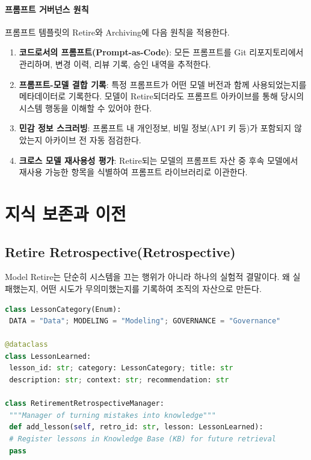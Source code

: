 \paragraph{프롬프트 거버넌스 원칙}
프롬프트 템플릿의 Retire와 Archiving에 다음 원칙을 적용한다.

\begin{enumerate}
 \item \textbf{코드로서의 프롬프트(Prompt-as-Code)}: 모든 프롬프트를 Git 리포지토리에서 관리하며, 변경 이력, 리뷰 기록, 승인 내역을 추적한다.
 \item \textbf{프롬프트-모델 결합 기록}: 특정 프롬프트가 어떤 모델 버전과 함께 사용되었는지를 메타데이터로 기록한다. 모델이 Retire되더라도 프롬프트 아카이브를 통해 당시의 시스템 행동을 이해할 수 있어야 한다.
 \item \textbf{민감 정보 스크러빙}: 프롬프트 내 개인정보, 비밀 정보(API 키 등)가 포함되지 않았는지 아카이브 전 자동 점검한다.
 \item \textbf{크로스 모델 재사용성 평가}: Retire되는 모델의 프롬프트 자산 중 후속 모델에서 재사용 가능한 항목을 식별하여 프롬프트 라이브러리로 이관한다.
\end{enumerate}


\section{지식 보존과 이전}
\label{sec:12.4}

\subsection{Retire Retrospective(Retrospective)}
\label{sec:12.4.2}

Model Retire는 단순히 시스템을 끄는 행위가 아니라 하나의 실험적 결말이다. 왜 실패했는지, 어떤 시도가 무의미했는지를 기록하여 조직의 자산으로 만든다.

\begin{lstlisting}[language=Python, caption={Retirement Retrospective and Lessons Learned Management System}, label={lst:retirement_retrospective}]
class LessonCategory(Enum):
 DATA = "Data"; MODELING = "Modeling"; GOVERNANCE = "Governance"

@dataclass
class LessonLearned:
 lesson_id: str; category: LessonCategory; title: str
 description: str; context: str; recommendation: str

class RetirementRetrospectiveManager:
 """Manager of turning mistakes into knowledge"""
 def add_lesson(self, retro_id: str, lesson: LessonLearned):
 # Register lessons in Knowledge Base (KB) for future retrieval
 pass
\end{lstlisting}


